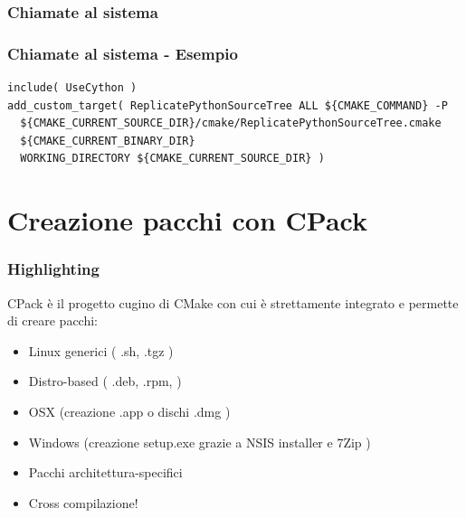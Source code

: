 \documentclass[10pt] {beamer}
\begin{document}

\begin{frame}
 \frametitle{Chiamate al sistema}

\end{frame}


\begin{frame}[fragile]
 \frametitle{Chiamate al sistema - Esempio}
\begin{verbatim}
include( UseCython )
add_custom_target( ReplicatePythonSourceTree ALL ${CMAKE_COMMAND} -P
  ${CMAKE_CURRENT_SOURCE_DIR}/cmake/ReplicatePythonSourceTree.cmake
  ${CMAKE_CURRENT_BINARY_DIR}
  WORKING_DIRECTORY ${CMAKE_CURRENT_SOURCE_DIR} )
\end{verbatim}
\end{frame}


\section{Creazione pacchi con CPack}
\begin{frame}
\frametitle{Highlighting}
CPack è il progetto cugino di CMake con cui è strettamente integrato e permette di creare pacchi:
\begin{itemize}
\item Linux generici ( .sh, .tgz )
\item Distro-based ( .deb, .rpm, )
\item OSX (creazione .app o dischi .dmg )
\item Windows (creazione setup.exe grazie a NSIS installer e 7Zip )
\end{itemize}
\begin{itemize}
\item Pacchi architettura-specifici
\item Cross compilazione!
\end{itemize}

\end{frame}


\newcommand{\putlink} [1]{%
                          \pgfsetlinewidth{1.4pt}%
                          \pgfsetendarrow{\pgfarrowtriangle{4pt}}%
\pgfline{\pgfxy(1,1)}{\pgfxy(#1,1)}
                         }
\end{document}
